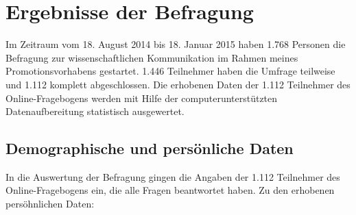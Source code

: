 \section{Ergebnisse der Befragung}

Im Zeitraum vom 18. August 2014 bis 18. Januar 2015 haben 1.768 Personen die Befragung zur wissenschaftlichen Kommunikation im Rahmen meines Promotionsvorhabens gestartet. 1.446 Teilnehmer haben die Umfrage teilweise und 1.112 komplett abgeschlossen. Die erhobenen Daten der 1.112 Teilnehmer des Online-Fragebogens werden mit Hilfe der computerunterstützten Datenaufbereitung statistisch ausgewertet.

\subsection{Demographische und persönliche Daten}

In die Auswertung der Befragung gingen die Angaben der 1.112 Teilnehmer des Online-Fragebogens ein, die alle Fragen beantwortet haben. Zu den erhobenen persöhnlichen Daten:

